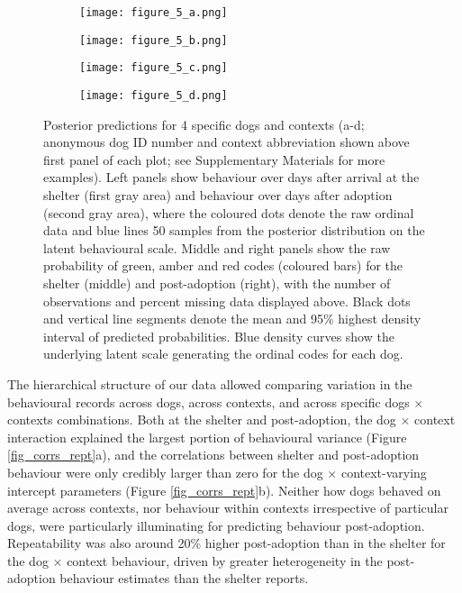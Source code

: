 \documentclass[12pt]{article}
\begin{document}
\begin{figure}[t!]
  \centering
  \begin{subfigure}{1\textwidth}
    \centering
    \texttt{[image: figure\_5\_a.png]}
  \end{subfigure}
  \begin{subfigure}{1\textwidth}
    \centering
    \vspace{-0.6cm}
    \texttt{[image: figure\_5\_b.png]}
  \end{subfigure}
  \begin{subfigure}{1\textwidth}
    \centering
    \vspace{-0.6cm}
    \texttt{[image: figure\_5\_c.png]}
  \end{subfigure}
  \begin{subfigure}{1\textwidth}
    \centering
    \vspace{-0.6cm}
    \texttt{[image: figure\_5\_d.png]}
  \end{subfigure}%
  \caption{\footnotesize{
  Posterior predictions for 4 specific dogs and contexts (a-d; anonymous dog ID number and context abbreviation shown above first panel of each plot; see Supplementary Materials for more examples). Left panels show behaviour over days after arrival at the shelter (first gray area) and behaviour over days after adoption (second gray area), where the coloured dots denote the raw ordinal data and blue lines 50 samples from the posterior distribution on the latent behavioural scale. Middle and right panels show the raw probability of green, amber and red codes (coloured bars) for the shelter (middle) and post-adoption (right), with the number of observations and percent missing data displayed above. Black dots and vertical line segments denote the mean and 95\% highest density interval of predicted probabilities. Blue density curves show the underlying latent scale generating the ordinal codes for each dog.}
  }
  \label{fig_pps}
\end{figure}

The hierarchical structure of our data allowed comparing variation in the behavioural records across dogs, across contexts, and across specific dogs $\times$ contexts combinations. Both at the shelter and post-adoption, the dog $\times$ context interaction explained the largest portion of behavioural variance (Figure \ref{fig_corrs_rept}a), and the correlations between shelter and post-adoption behaviour were only credibly larger than zero for the dog $\times$ context-varying intercept parameters (Figure \ref{fig_corrs_rept}b). Neither how dogs behaved on average across contexts, nor behaviour within contexts irrespective of particular dogs, were particularly illuminating for predicting behaviour post-adoption. Repeatability was also around 20\% higher post-adoption than in the shelter for the dog $\times$ context behaviour, driven by greater heterogeneity in the post-adoption behaviour estimates than the shelter reports.
\end{document}
